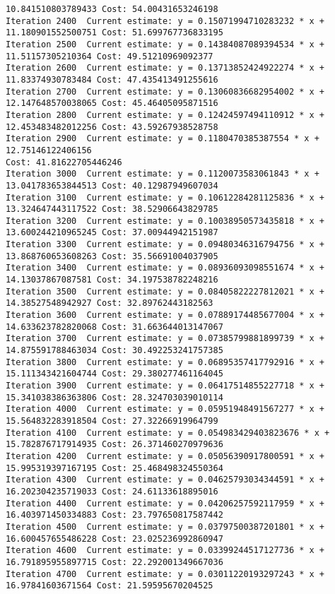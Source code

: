 \documentclass[11pt]{article}
\begin{document}
\begin{Verbatim}[commandchars=\\\{\}]
10.841510803789433 Cost: 54.00431653246198
Iteration 2400  Current estimate: y = 0.15071994710283232 * x +
11.180901552500751 Cost: 51.699767736833195
Iteration 2500  Current estimate: y = 0.14384087089394534 * x +
11.51157305210364 Cost: 49.51210969092377
Iteration 2600  Current estimate: y = 0.13713852424922274 * x +
11.83374930783484 Cost: 47.435413491255616
Iteration 2700  Current estimate: y = 0.13060836682954002 * x +
12.147648570038065 Cost: 45.46405095871516
Iteration 2800  Current estimate: y = 0.12424597494110912 * x +
12.453483482012256 Cost: 43.59267938528758
Iteration 2900  Current estimate: y = 0.1180470385387554 * x + 12.75146122406156
Cost: 41.81622705446246
Iteration 3000  Current estimate: y = 0.1120073583061843 * x +
13.041783653844513 Cost: 40.12987949607034
Iteration 3100  Current estimate: y = 0.10612284281125836 * x +
13.324647443117522 Cost: 38.52906643829785
Iteration 3200  Current estimate: y = 0.10038950573435818 * x +
13.600244210965245 Cost: 37.00944942151987
Iteration 3300  Current estimate: y = 0.09480346316794756 * x +
13.868760653608263 Cost: 35.56691004037905
Iteration 3400  Current estimate: y = 0.08936093098551674 * x +
14.13037867087581 Cost: 34.197538782248216
Iteration 3500  Current estimate: y = 0.08405822227812021 * x +
14.38527548942927 Cost: 32.89762443182563
Iteration 3600  Current estimate: y = 0.07889174485677004 * x +
14.633623782820068 Cost: 31.663644013147067
Iteration 3700  Current estimate: y = 0.07385799881899739 * x +
14.875591788463034 Cost: 30.492253241757385
Iteration 3800  Current estimate: y = 0.06895357417792916 * x +
15.111343421604744 Cost: 29.380277461164045
Iteration 3900  Current estimate: y = 0.06417514855227718 * x +
15.341038386363806 Cost: 28.324703039010114
Iteration 4000  Current estimate: y = 0.05951948491567277 * x +
15.564832283918504 Cost: 27.32266919964799
Iteration 4100  Current estimate: y = 0.054983429403823676 * x +
15.782876717914935 Cost: 26.371460270979636
Iteration 4200  Current estimate: y = 0.05056390917800591 * x +
15.995319397167195 Cost: 25.468498324550364
Iteration 4300  Current estimate: y = 0.04625793034344591 * x +
16.202304235719033 Cost: 24.61133618895016
Iteration 4400  Current estimate: y = 0.04206257592117959 * x +
16.403971450334883 Cost: 23.797650817587442
Iteration 4500  Current estimate: y = 0.03797500387201801 * x +
16.600457655486228 Cost: 23.025236992860947
Iteration 4600  Current estimate: y = 0.03399244517127736 * x +
16.791895955897715 Cost: 22.292001349667036
Iteration 4700  Current estimate: y = 0.03011220193297243 * x +
16.97841603671564 Cost: 21.59595670204525

\end{Verbatim}
\end{document}
